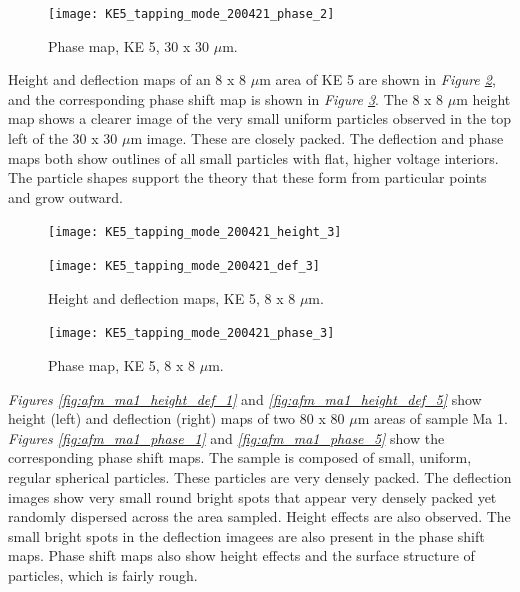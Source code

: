 \begin{figure}[H]
\centering
  \texttt{[image: KE5\_tapping\_mode\_200421\_phase\_2]}
\caption[Phase map, KE 5]{Phase map, KE 5, 30 x 30 $\mu$m.}
\label{fig:afm_ke5_phase_2}
\end{figure}

Height and deflection maps of an 8 x 8 $\mu$m area of KE 5 are shown in \textit{Figure \ref{fig:afm_ke5_height_def_3}}, and the corresponding phase shift map is shown in \textit{Figure \ref{fig:afm_ke5_phase_3}}. The 8 x 8 $\mu$m height map shows a clearer image of the very small uniform particles observed in the top left of the 30 x 30 $\mu$m image. These are closely packed. The deflection and phase maps both show outlines of all small particles with flat, higher voltage interiors. The particle shapes support the theory that these form from particular points and grow outward.

\begin{figure}[H]
\centering
\begin{minipage}{.45\textwidth}
  \centering
  \texttt{[image: KE5\_tapping\_mode\_200421\_height\_3]}
\end{minipage}
\begin{minipage}{.45\textwidth}
  \centering
  \texttt{[image: KE5\_tapping\_mode\_200421\_def\_3]}
\end{minipage}
\caption[Height and deflection maps, KE 5]{Height and deflection maps, KE 5, 8 x 8 $\mu$m.}
\label{fig:afm_ke5_height_def_3}
\end{figure}

\begin{figure}[H]
\centering
  \texttt{[image: KE5\_tapping\_mode\_200421\_phase\_3]}
\caption[Phase map, KE 5]{Phase map, KE 5, 8 x 8 $\mu$m.}
\label{fig:afm_ke5_phase_3}
\end{figure}



\textit{Figures \ref{fig:afm_ma1_height_def_1}} and \textit{\ref{fig:afm_ma1_height_def_5}} show height (left) and deflection (right) maps of two 80 x 80 $\mu$m areas of sample Ma 1. \textit{Figures \ref{fig:afm_ma1_phase_1}} and \textit{\ref{fig:afm_ma1_phase_5}} show the corresponding phase shift maps. The sample is composed of small, uniform, regular spherical particles. These particles are very densely packed. The deflection images show very small round bright spots that appear very densely packed yet randomly dispersed across the area sampled. Height effects are also observed. The small bright spots in the deflection imagees are also present in the phase shift maps. Phase shift maps also show height effects and the surface structure of particles, which is fairly rough.



